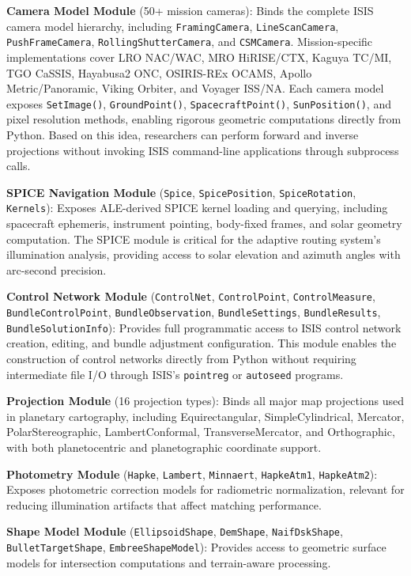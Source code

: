\documentclass[lettersize,journal]{IEEEtran}
\begin{document}
\textbf{Camera Model Module} (50+ mission cameras): Binds the complete ISIS camera model hierarchy, including \texttt{FramingCamera}, \texttt{LineScanCamera}, \texttt{PushFrameCamera}, \texttt{RollingShutterCamera}, and \texttt{CSMCamera}. Mission-specific implementations cover LRO NAC/WAC, MRO HiRISE/CTX, Kaguya TC/MI, TGO CaSSIS, Hayabusa2 ONC, OSIRIS-REx OCAMS, Apollo Metric/Panoramic, Viking Orbiter, and Voyager ISS/NA. Each camera model exposes \texttt{SetImage()}, \texttt{GroundPoint()}, \texttt{SpacecraftPoint()}, \texttt{SunPosition()}, and pixel resolution methods, enabling rigorous geometric computations directly from Python. Based on this idea, researchers can perform forward and inverse projections without invoking ISIS command-line applications through subprocess calls.

\textbf{SPICE Navigation Module} (\texttt{Spice}, \texttt{SpicePosition}, \texttt{SpiceRotation}, \texttt{Kernels}): Exposes ALE-derived SPICE kernel loading and querying, including spacecraft ephemeris, instrument pointing, body-fixed frames, and solar geometry computation. The SPICE module is critical for the adaptive routing system's illumination analysis, providing access to solar elevation and azimuth angles with arc-second precision.

\textbf{Control Network Module} (\texttt{ControlNet}, \texttt{ControlPoint}, \texttt{ControlMeasure}, \texttt{BundleControlPoint}, \texttt{BundleObservation}, \texttt{BundleSettings}, \texttt{BundleResults}, \texttt{BundleSolutionInfo}): Provides full programmatic access to ISIS control network creation, editing, and bundle adjustment configuration. This module enables the construction of control networks directly from Python without requiring intermediate file I/O through ISIS's \texttt{pointreg} or \texttt{autoseed} programs.

\textbf{Projection Module} (16 projection types): Binds all major map projections used in planetary cartography, including Equirectangular, SimpleCylindrical, Mercator, PolarStereographic, LambertConformal, TransverseMercator, and Orthographic, with both planetocentric and planetographic coordinate support.

\textbf{Photometry Module} (\texttt{Hapke}, \texttt{Lambert}, \texttt{Minnaert}, \texttt{HapkeAtm1}, \texttt{HapkeAtm2}): Exposes photometric correction models for radiometric normalization, relevant for reducing illumination artifacts that affect matching performance.

\textbf{Shape Model Module} (\texttt{EllipsoidShape}, \texttt{DemShape}, \texttt{NaifDskShape}, \texttt{BulletTargetShape}, \texttt{EmbreeShapeModel}): Provides access to geometric surface models for intersection computations and terrain-aware processing.
\end{document}
